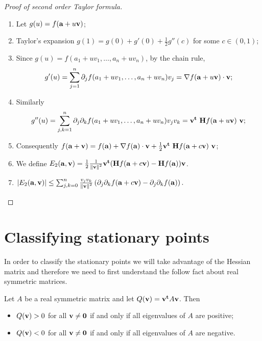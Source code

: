 \begin{proof}[Proof of second order Taylor formula]

    \begin{enumerate}
        \item Let \(g(u) = f(\mathbf{a} + u \mathbf{v})\);
        \item Taylor's expansion \(g(1) = g(0) + g'(0) + \frac{1}{2} g''(c)\) for some \(c\in (0,1)\);
        \item Since \(g(u) = f(a_1 + uv_1, \ldots, a_n + u v_n)\), by the chain rule,
              \[
                  g'(u) = \sum_{j=1}^{n} \partial_j f( a_1 + uv_1, \ldots, a_n + u v_n ) v_j
                  =\nabla f( \mathbf{a} + u \mathbf{v}) \cdot \mathbf{v};
              \]
              \vspace{-2em}
        \item Similarly
              \vspace{-1em}
              \[
                  g''(u) = \sum_{j,k=1}^{n} \partial_j\partial_k f( a_1 + uv_1, \ldots, a_n + u v_n ) v_j v_k
                  =  \vv^{\mathbf{t}} \ \mathbf{H} f (\aa + u \vv) \ \vv;
              \]
              \vspace{-1em}
        \item Consequently
              \(
              f(\mathbf{a}+\mathbf{v}) = f(\mathbf{a}) + \nabla f(\mathbf{a}) \cdot \mathbf{v} + \frac{1}{2} \mathbf{v}^{\mathbf{t}} \ \mathbf{H} f (\mathbf{a} + c\mathbf{v}) \ \mathbf{v}
              \);
        \item We define \(E_2(\mathbf{a},\mathbf{v}) = \frac{1}{2} \frac{1}{\left\|\mathbf{v}\right\|^2} \mathbf{v}^{\mathbf{t}} (\mathbf{H} f (\mathbf{a} + c\mathbf{v}) - \mathbf{H} f (\mathbf{a})  ) \mathbf{v}\).
        \item \(\left|E_2(\mathbf{a},\mathbf{v})\right| \leq \sum_{j,k=0}^{n}
              \frac{v_j v_k}{\left\|\mathbf{v}\right\|^2} \left( \partial_{j}\partial_{k}f(\mathbf{a}+c\mathbf{v})-\partial_{j}\partial_{k}f(\mathbf{a}) \right).\)
              \qedhere
    \end{enumerate}
\end{proof}


\section{Classifying stationary points}

In order to classify the stationary points we will take advantage of the Hessian matrix and therefore we need to first understand the follow fact about real symmetric matrices.

\begin{theorem}
    Let \(A\) be a real symmetric matrix and let
    \(Q(\mathbf{v}) =  \mathbf{v}^{\mathbf{t}} A  \mathbf{v}  \).
    Then
    \begin{itemize}
        \item \(Q(\mathbf{v}) > 0\) for all \(\mathbf{v} \neq \mathbf{0}\) if and only if all eigenvalues of \(A\) are positive;
        \item \(Q(\mathbf{v}) < 0\) for all \(\mathbf{v} \neq \mathbf{0}\) if and only if all eigenvalues of \(A\) are negative.
    \end{itemize}
\end{theorem}

